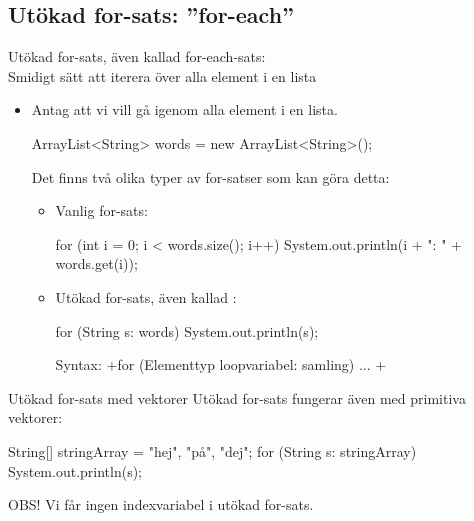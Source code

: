 \documentclass{lecturenotes}
\begin{document}
\subsection{Utökad for-sats: ''for-each''}
\begin{Slide}{Utökad for-sats, även kallad for-each-sats: \\ Smidigt sätt att iterera över alla element i en lista}\footnotesize
\begin{itemize}
\item  Antag att vi vill gå igenom alla element i en lista. 
\begin{Code}[numberstyle=]
        ArrayList<String> words = new ArrayList<String>();
\end{Code}
Det finns två olika typer av for-satser som kan göra detta:
\begin{itemize}\footnotesize
\item  Vanlig for-sats:
\begin{Code}[numberstyle=]
for (int i = 0; i < words.size(); i++) {
    System.out.println(i + ": " + words.get(i));
}
\end{Code}

\item  Utökad for-sats, även kallad :
\begin{Code}[numberstyle=]
for (String s: words) {
    System.out.println(s);
}
\end{Code}
Syntax: \code+for (Elementtyp loopvariabel: samling) { ... }+
\end{itemize}
\end{itemize}
\end{Slide}

\begin{Slide}{Utökad for-sats med vektorer}
Utökad for-sats fungerar även med primitiva vektorer:
\begin{Code}[numberstyle=]
        String[] stringArray = {"hej", "på", "dej"};
        for (String s: stringArray){
            System.out.println(s);
        }
\end{Code}
OBS! Vi får ingen indexvariabel i utökad for-sats.
\end{Slide}
\end{document}
